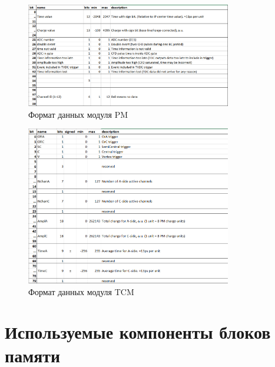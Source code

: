 \documentclass{article}
\begin{document}
\begin{figure}[H]
	\centering 
	\includegraphics[width=0.8\textwidth]{PM_data.png}
	\caption{\label{fig:8} Формат данных модуля PM}
\end{figure}

\begin{figure}[H]
	\centering 
	\includegraphics[width=0.8\textwidth]{TCM_data.png}
	\caption{\label{fig:9} Формат данных модуля TCM}
\end{figure}




\section{Используемые компоненты блоков памяти}
\end{document}
